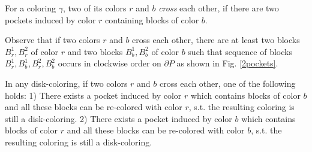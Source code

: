 \documentclass{llncs}
\begin{document}
\vspace{-25pt}




\begin{definition}
For a coloring $\gamma$, two of its colors $r$ and $b$ \emph{cross} each other, if there are two pockets induced by color $r$ containing blocks of color $b$.
\end{definition}

Observe that if two colors $r$ and $b$ cross each other, there are at least two blocks $B^1_r, B^2_r$ of color $r$ and two blocks $B^1_b, B^2_b$ of color $b$ such that sequence of blocks $B^1_r, B^1_b, B^2_r, B^2_b$ occurs in clockwise order on $\partial P$ as shown in Fig. \ref{2pockets}.

\begin{lemma}
In any disk-coloring, if two colors $r$ and $b$ cross each other, one of the following holds: 1) There exists a pocket induced by color $r$ which contains blocks of color $b$ and all these blocks can be re-colored with color $r$, s.t. the resulting coloring is still a disk-coloring. 2) There exists a pocket induced by color $b$ which contains blocks of color $r$ and all these blocks can  be re-colored with color $b$, s.t. the resulting coloring is still a disk-coloring.
\label{crossLem}
\end{lemma}
\end{document}
